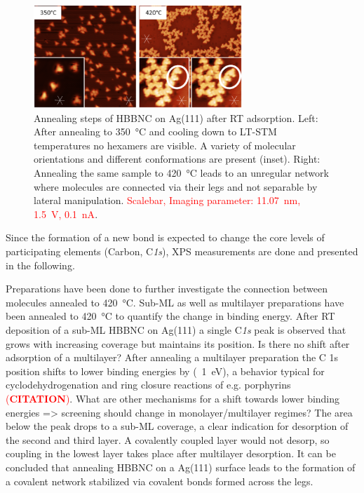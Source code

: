 \begin{figure}[] \centering
	\includegraphics[width=0.7\textwidth]{./images/hbbnc-ag-111-annealed}
	\caption{Annealing steps of HBBNC on Ag(111) after RT adsorption. Left: After annealing to \SI{350}{\celsius} and cooling down to LT-STM temperatures no hexamers are visible. A variety of molecular orientations and different conformations are present (inset). Right: Annealing the same sample to \SI{420}{\celsius} leads to an unregular network where molecules are connected via their legs and not separable by lateral manipulation. \textcolor{red}{Scalebar, Imaging parameter: \SI{11.07}{\nano \meter}, \SI{1.5}{\volt}, \SI{0.1}{\nano \ampere}}.}
	\label{}
\end{figure}

Since the formation of a new bond is expected to change the core levels of participating elements (Carbon, C\textit{1s}), XPS measurements are done and presented in the following.

Preparations have been done to further investigate the connection between molecules annealed to \SI{420}{\celsius}. Sub-ML as well as multilayer preparations have been annealed to \SI{420}{\celsius} to quantify the change in binding energy. After RT deposition of a sub-ML HBBNC on Ag(111) a single C\textit{1s} peak is observed that grows with increasing coverage but maintains its position.
Is there no shift after adsorption of a multilayer?
After annealing a multilayer preparation the C 1s position shifts to lower binding energies by (~\SI{1}{\eV}), a behavior typical for cyclodehydrogenation and ring closure reactions of e.g. porphyrins \textcolor{red}{(\textbf{CITATION})}. What are other mechanisms for a shift towards lower binding energies => screening should change in monolayer/multilayer regimes? The area below the peak drops to a sub-ML coverage, a clear indication for desorption of the second and third layer. A covalently coupled layer would not desorp, so coupling in the lowest layer takes place after multilayer desorption.
It can be concluded that annealing HBBNC on a Ag(111) surface leads to the formation of a covalent network stabilized via covalent bonds formed across the legs.

